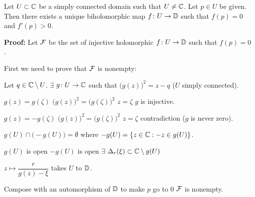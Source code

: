 \documentclass[10pt,aspectratio=169]{beamer}
\begin{document}
\begin{frame}
\begin{theorem}
Let $U \subset {\mathbb{C}}$ be a simply connected domain such that $U \not= {\mathbb{C}}$.
Let $p \in U$ be given.  Then there exists a unique biholomorphic
map $f \colon U \to {\mathbb{D}}$ such that $f(p) = 0$ and
$f'(p) > 0$.
\end{theorem}

\pause


\textbf{Proof:}
Let ${\mathcal{F}}$ be the set of injective holomorphic $f \colon U \to {\mathbb{D}}$ such that $f(p) = 0$. 

\pause
\medskip

First we need to prove that ${\mathcal{F}}$ is nonempty:

\medskip
\pause

Let $q \in {\mathbb{C}} \setminus U$.
\quad
\pause
$\exists$ $g \colon U \to {\mathbb{C}}$ such that ${\bigl(g(z)\bigr)}^2 = z-q$
\quad ($U$ simply connected).

\medskip

\pause
$g(z)=g(\zeta)$
\wthus
${\bigl(g(z)\bigr)}^2={\bigl(g(\zeta)\bigr)}^2$
\pause
\wthus
$z=\zeta$
\pause
\wthus
$g$ is injective.

\medskip

\pause
$g(z)=-g(\zeta)$
\wthus
${\bigl(g(z)\bigr)}^2={\bigl(g(\zeta)\bigr)}^2$
\pause
\wthus
$z=\zeta$
\pause
\wthus
contradiction
($g$ is never zero).

\pause
\thus\quad
$g(U) \cap \bigl( - g(U) \bigr) = \emptyset$
\quad
where
$-g(U) = \{ z \in {\mathbb{C}} : -z \in g(U) \}$.

\medskip

$g(U)$ is open
\pause
\wthus
$-g(U)$ is open
\pause
\wthus $\exists$ $\Delta_r(\xi) \subset  {\mathbb{C}} \setminus g(U)$

\medskip

\pause
\thus \quad
$z \mapsto \dfrac{r}{g(z)-\xi}$
\quad
takes $U$ to ${\mathbb{D}}$.

\medskip

\pause
Compose with an automorphism of ${\mathbb{D}}$ to make $p$ go to $0$
\pause
\wthus
${\mathcal{F}}$ is nonempty.
\end{frame}
\end{document}
